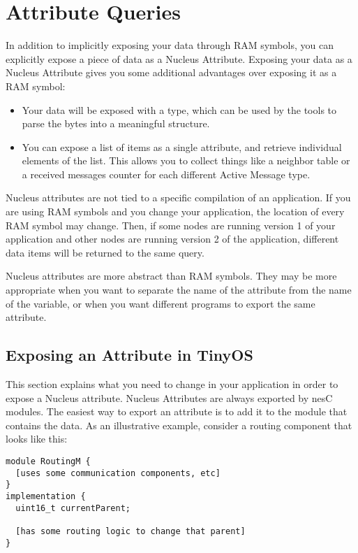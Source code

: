 \documentclass{article}
\begin{document}
\newpage
\section{Attribute Queries}

In addition to implicitly exposing your data through RAM symbols, you
can explicitly expose a piece of data as a Nucleus Attribute. Exposing
your data as a Nucleus Attribute gives you some additional advantages
over exposing it as a RAM symbol:

\begin{itemize}
\item Your data will be exposed with a type, which can be used by the
tools to parse the bytes into a meaningful structure.
\item You can expose a list of items as a single attribute, and
retrieve individual elements of the list. This allows you to collect
things like a neighbor table or a received messages counter for each
different Active Message type.
\end{itemize}

Nucleus attributes are not tied to a specific compilation of an
application. If you are using RAM symbols and you change your
application, the location of every RAM symbol may change. Then, if
some nodes are running version 1 of your application and other nodes
are running version 2 of the application, different data items will be
returned to the same query. 

Nucleus attributes are more abstract than RAM symbols. They may be
more appropriate when you want to separate the name of the attribute
from the name of the variable, or when you want different programs to
export the same attribute.

\subsection{Exposing an Attribute in TinyOS}

This section explains what you need to change in your application in
order to expose a Nucleus attribute. Nucleus Attributes are always
exported by nesC modules. The easiest way to export an attribute is to
add it to the module that contains the data. As an illustrative
example, consider a routing component that looks like this:

\begin{verbatim}
module RoutingM {
  [uses some communication components, etc]
}
implementation {
  uint16_t currentParent;

  [has some routing logic to change that parent]
}
\end{verbatim}
\end{document}
